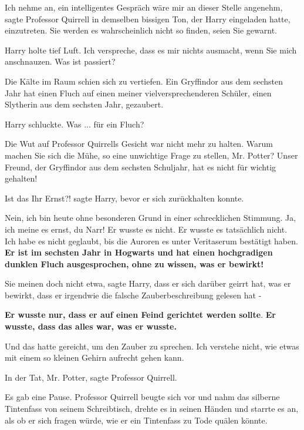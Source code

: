 \glqq{}Ich nehme an, ein intelligentes Gespräch wäre mir an dieser Stelle
angenehm\grqq{}, sagte Professor Quirrell in demselben bissigen Ton, der Harry
eingeladen hatte, einzutreten. \glqq{}Sie werden es wahrscheinlich nicht so
finden, seien Sie gewarnt.\grqq{}

Harry holte tief Luft. \glqq{}Ich verspreche, dass es mir nichts ausmacht, wenn
Sie mich anschnauzen. Was ist passiert?\grqq{}

Die Kälte im Raum schien sich zu vertiefen. \glqq{}Ein Gryffindor aus dem
sechsten Jahr hat einen Fluch auf einen meiner vielversprechenderen Schüler,
einen Slytherin aus dem sechsten Jahr, gezaubert.\grqq{}

Harry schluckte. \glqq{}Was ... für ein Fluch?\grqq{}

Die Wut auf Professor Quirrells Gesicht war nicht mehr zu halten. \glqq{}Warum
machen Sie sich die Mühe, so eine unwichtige Frage zu stellen, Mr. Potter? Unser
Freund, der Gryffindor aus dem sechsten Schuljahr, hat es nicht für wichtig
gehalten!\grqq{}

\glqq{}Ist das Ihr Ernst?!\grqq{} sagte Harry, bevor er sich zurückhalten
konnte.

\glqq{}Nein, ich bin heute ohne besonderen Grund in einer schrecklichen
Stimmung. Ja, ich meine es ernst, du Narr! Er wusste es nicht. Er wusste es
tatsächlich nicht. Ich habe es nicht geglaubt, bis die Auroren es unter
Veritaserum bestätigt haben. \textbf{Er ist im sechsten Jahr in Hogwarts und hat
einen hochgradigen dunklen Fluch ausgesprochen, ohne zu wissen, was er
bewirkt!}\grqq{}

\glqq{}Sie meinen doch nicht etwa\grqq{}, sagte Harry, \glqq{}dass er sich
darüber geirrt hat, was er bewirkt, dass er irgendwie die falsche
Zauberbeschreibung gelesen hat -\grqq{}

\glqq{}\textbf{Er wusste nur, dass er auf einen Feind gerichtet werden sollte}.
\textbf{Er wusste, dass das alles war, was er wusste.}\grqq{}

Und das hatte gereicht, um den Zauber zu sprechen. \glqq{}Ich verstehe nicht,
wie etwas mit einem so kleinen Gehirn aufrecht gehen kann.\grqq{}

\glqq{}In der Tat, Mr. Potter\grqq{}, sagte Professor Quirrell.

Es gab eine Pause. Professor Quirrell beugte sich vor und nahm das silberne
Tintenfass von seinem Schreibtisch, drehte es in seinen Händen und starrte es
an, als ob er sich fragen würde, wie er ein Tintenfass zu Tode quälen könnte.

